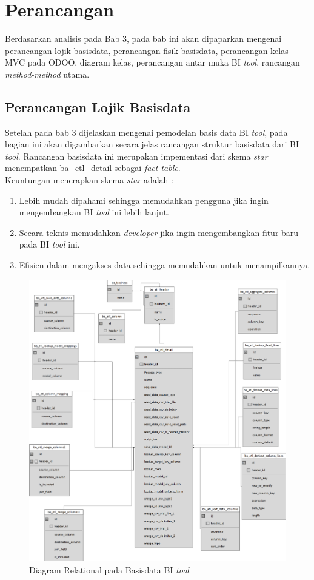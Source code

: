 \chapter{Perancangan}
\label{chap:design}
Berdasarkan analisis pada Bab 3, pada bab ini akan dipaparkan mengenai perancangan lojik basisdata, perancangan fisik basisdata, perancangan kelas MVC pada ODOO, diagram kelas, perancangan antar muka BI \textit{tool}, rancangan \textit{method-method} utama.

\section{Perancangan Lojik Basisdata}
Setelah pada bab 3 dijelaskan mengenai pemodelan basis data BI \textit{tool}, pada bagian ini akan digambarkan secara jelas rancangan struktur basisdata dari BI \textit{tool}. Rancangan basisdata ini merupakan impementasi dari skema \textit{star} menempatkan ba\_etl\_detail sebagai \textit{fact table}.\\
Keuntungan menerapkan skema \textit{star} adalah : 
\begin{enumerate}
	\item Lebih mudah dipahami sehingga memudahkan pengguna jika ingin mengembangkan BI \textit{tool} ini lebih lanjut.
	\item Secara teknis memudahkan \textit{developer} jika ingin mengembangkan fitur baru pada BI \textit{tool} ini.
	\item Efisien dalam mengakses data sehingga memudahkan untuk menampilkannya.
\end{enumerate}


\begin{figure}[H]
	\centering
	\includegraphics[scale=0.3]{Gambar/rancangan-basisdata-bi}
	\caption{Diagram Relational pada Basisdata BI \textit{tool}}
	\end{figure}
	
